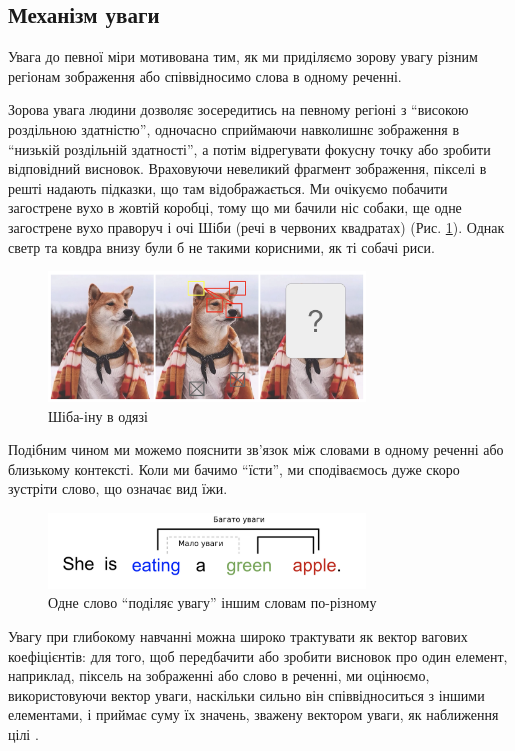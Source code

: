 \documentclass[a4paper,14pt]{extreport}
\begin{document}
\subsection{Механізм уваги}
Увага до певної міри мотивована тим, як ми приділяємо зорову увагу
різним регіонам зображення або співвідносимо слова в одному реченні.

Зорова увага людини дозволяє зосередитись на певному регіоні з
``високою роздільною здатністю'', одночасно сприймаючи навколишнє
зображення в ``низькій роздільній здатності'', а потім відрегувати
фокусну точку або зробити відповідний висновок.
Враховуючи невеликий фрагмент зображення, пікселі в решті надають підказки, що
там відображається. Ми очікуємо побачити загострене вухо в жовтій коробці,
тому що ми бачили ніс собаки, ще одне загострене вухо праворуч і очі
Шіби (речі в червоних квадратах) (Рис. \ref{fig:shiba}). Однак
светр та ковдра внизу були
б не такими корисними, як ті собачі риси.

\begin{figure}[H]
    \centering
    \includegraphics[width=0.75\textwidth]{shiba-example-attention.png}
    \caption{Шіба-іну в одязі}
    \label{fig:shiba}
\end{figure}

Подібним чином ми можемо пояснити зв'язок між словами в одному реченні
або близькому контексті. Коли ми бачимо ``їсти'', ми сподіваємось дуже
скоро зустріти слово, що означає вид їжи.

\begin{figure}[H]
    \centering
    \includegraphics[width=0.75\textwidth]{sentence-example-attention.png}
    \caption{Одне слово ``поділяє увагу'' іншим словам по-різному}
    \label{fig:attend-example}
\end{figure}

Увагу при глибокому навчанні можна широко трактувати як вектор вагових
коефіцієнтів: для того, щоб передбачити або зробити висновок про один елемент,
наприклад, піксель на зображенні або слово в реченні, ми оцінюємо,
використовуючи вектор уваги, наскільки сильно він співвідноситься з іншими
елементами,
і приймає суму їх значень, зважену вектором уваги, як наближення
цілі \cite{attention}.
\end{document}
